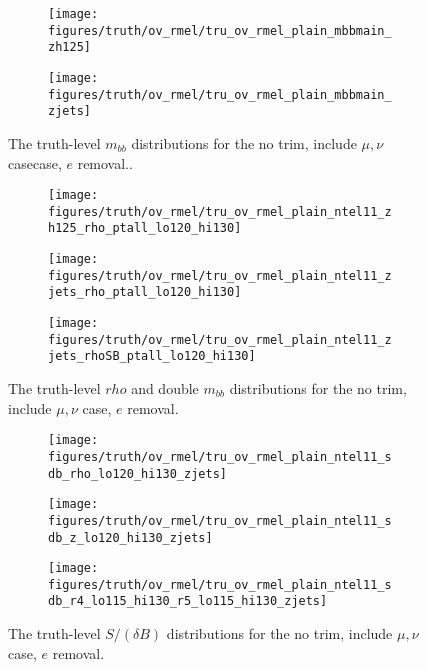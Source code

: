 \begin{figure}[!htbp]\captionsetup{justification=centering}
\begin{center}
\begin{subfigure}[t]{18pc}\centering\texttt{[image: figures/truth/ov\_rmel/tru\_ov\_rmel\_plain\_mbbmain\_zh125]}\caption{}\end{subfigure}
\begin{subfigure}[t]{18pc}\centering\texttt{[image: figures/truth/ov\_rmel/tru\_ov\_rmel\_plain\_mbbmain\_zjets]}\caption{}\end{subfigure}
\caption{\label{fig:mbbplainovrmel1}The truth-level $m_{bb}$ distributions for the no trim, include $\mu,\nu$ casecase, $e$ removal..}
\end{center}
\end{figure}
\begin{figure}[!htbp]\captionsetup{justification=centering}
\begin{center}
\begin{subfigure}[t]{18pc}\centering\texttt{[image: figures/truth/ov\_rmel/tru\_ov\_rmel\_plain\_ntel11\_zh125\_rho\_ptall\_lo120\_hi130]}\caption{}\end{subfigure}
\begin{subfigure}[t]{18pc}\centering\texttt{[image: figures/truth/ov\_rmel/tru\_ov\_rmel\_plain\_ntel11\_zjets\_rho\_ptall\_lo120\_hi130]}\caption{}\end{subfigure}
\begin{subfigure}[t]{18pc}\centering\texttt{[image: figures/truth/ov\_rmel/tru\_ov\_rmel\_plain\_ntel11\_zjets\_rhoSB\_ptall\_lo120\_hi130]}\caption{}\end{subfigure}
\caption{\label{fig:rhoplainovrm1}The truth-level $rho$ and double $m_{bb}$ distributions for the no trim, include $\mu,\nu$ case, $e$ removal.}
\end{center}
\end{figure}
\begin{figure}[!htbp]\captionsetup{justification=centering}
\begin{center}
\begin{subfigure}[t]{18pc}\centering\texttt{[image: figures/truth/ov\_rmel/tru\_ov\_rmel\_plain\_ntel11\_sdb\_rho\_lo120\_hi130\_zjets]}\caption{}\end{subfigure}
\begin{subfigure}[t]{18pc}\centering\texttt{[image: figures/truth/ov\_rmel/tru\_ov\_rmel\_plain\_ntel11\_sdb\_z\_lo120\_hi130\_zjets]}\caption{}\end{subfigure}
\begin{subfigure}[t]{18pc}\centering\texttt{[image: figures/truth/ov\_rmel/tru\_ov\_rmel\_plain\_ntel11\_sdb\_r4\_lo115\_hi130\_r5\_lo115\_hi130\_zjets]}\caption{}\end{subfigure}
\caption{\label{fig:mbbplain}The truth-level $S/(\delta B)$ distributions for the no trim, include $\mu,\nu$ case, $e$ removal.}
\end{center}
\end{figure}


